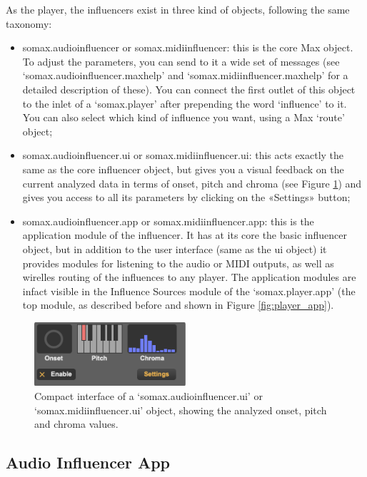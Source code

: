 As the player, the influencers exist in three kind of objects, following the same taxonomy:

\begin{itemize}
    \item somax.audioinfluencer or somax.midiinfluencer: this is the core Max object. To adjust the parameters, you can send to it a wide set of messages (see `somax.audioinfluencer.maxhelp' and `somax.midiinfluencer.maxhelp' for a detailed description of these). You can connect the first outlet of this object to the inlet of a `somax.player' after prepending the word `influence' to it. You can also select which kind of influence you want, using a Max `route' object;
    \item somax.audioinfluencer.ui or somax.midiinfluencer.ui: this acts exactly the same as the core influencer object, but gives you a visual feedback on the current analyzed data in terms of onset, pitch and chroma (see Figure \ref{fig:influencer_ui}) and gives you access to all its parameters by clicking on the «Settings» button;
    \item somax.audioinfluencer.app or somax.midiinfluencer.app: this is the application module of the influencer. It has at its core the basic influencer object, but in addition to the user interface (same as the ui object) it provides modules for listening to the audio or MIDI outputs, as well as wirelles routing of the influences to any player. The application modules are infact visible in the Influence Sources module of the `somax.player.app' (the top module, as described before and shown in Figure \ref{fig:player_app}).
\end{itemize}


 \begin{figure}[H]
    \centering        
 	\includegraphics[width=0.5\textwidth, keepaspectratio]{img/influencer_ui.png}
    \caption{Compact interface of a `somax.audioinfluencer.ui' or `somax.midiinfluencer.ui' object, showing the analyzed onset, pitch and chroma values.}
    \label{fig:influencer_ui}
\end{figure}


\subsection{Audio Influencer App}

